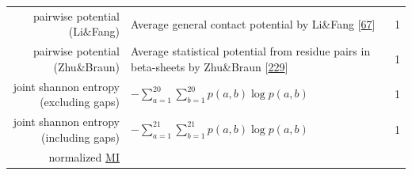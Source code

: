 \documentclass[11pt,a4paper,twoside]{book}
\theoremstyle{definition}
\theoremstyle{definition}
\theoremstyle{remark}
\begin{document}
\begin{longtable}[]{@{}rlc@{}}
\begin{minipage}[t]{0.23\columnwidth}\raggedleft\strut
pairwise potential (Li\&Fang)\strut
\end{minipage} & \begin{minipage}[t]{0.50\columnwidth}\raggedright\strut
Average general contact potential by Li\&Fang
{[}\protect\hyperlink{ref-Li2011}{67}{]}\strut
\end{minipage} & \begin{minipage}[t]{0.18\columnwidth}\centering\strut
1\strut
\end{minipage}\tabularnewline
\begin{minipage}[t]{0.23\columnwidth}\raggedleft\strut
pairwise potential (Zhu\&Braun)\strut
\end{minipage} & \begin{minipage}[t]{0.50\columnwidth}\raggedright\strut
Average statistical potential from residue pairs in beta-sheets by
Zhu\&Braun {[}\protect\hyperlink{ref-Zhu1999}{229}{]}\strut
\end{minipage} & \begin{minipage}[t]{0.18\columnwidth}\centering\strut
1\strut
\end{minipage}\tabularnewline
\begin{minipage}[t]{0.23\columnwidth}\raggedleft\strut
joint shannon entropy (excluding gaps)\strut
\end{minipage} & \begin{minipage}[t]{0.50\columnwidth}\raggedright\strut
\(- \sum_{a=1}^{20}\sum_{b=1}^{20} p(a,b) \log p(a,b)\)\strut
\end{minipage} & \begin{minipage}[t]{0.18\columnwidth}\centering\strut
1\strut
\end{minipage}\tabularnewline
\begin{minipage}[t]{0.23\columnwidth}\raggedleft\strut
joint shannon entropy (including gaps)\strut
\end{minipage} & \begin{minipage}[t]{0.50\columnwidth}\raggedright\strut
\(- \sum_{a=1}^{21}\sum_{b=1}^{21} p(a,b) \log p(a,b)\)\strut
\end{minipage} & \begin{minipage}[t]{0.18\columnwidth}\centering\strut
1\strut
\end{minipage}\tabularnewline
\begin{minipage}[t]{0.23\columnwidth}\raggedleft\strut
normalized \protect\hyperlink{abbrev}{MI}\strut
\end{minipage} & \begin{minipage}[t]{0.50\columnwidth}\raggedright\strut

\end{minipage}
\end{longtable}
\end{document}

